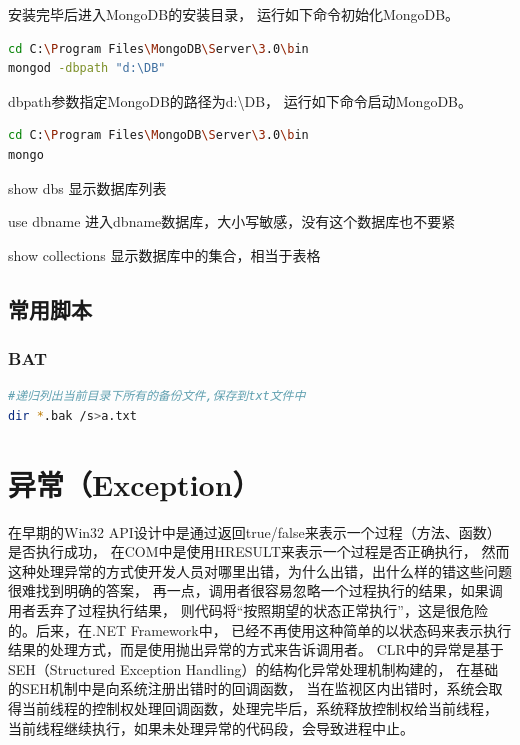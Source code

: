 \documentclass{book}
\begin{document}
安装完毕后进入MongoDB的安装目录，
运行如下命令初始化MongoDB。

\begin{lstlisting}[language=Bash]
cd C:\Program Files\MongoDB\Server\3.0\bin
mongod -dbpath "d:\DB"
\end{lstlisting}

dbpath参数指定MongoDB的路径为d:\textbackslash DB，
运行如下命令启动MongoDB。

\begin{lstlisting}[language=Bash]
cd C:\Program Files\MongoDB\Server\3.0\bin
mongo
\end{lstlisting}


show dbs    显示数据库列表

use dbname    进入dbname数据库，大小写敏感，没有这个数据库也不要紧

show collections    显示数据库中的集合，相当于表格


\section{常用脚本}

\subsection{BAT}

\begin{lstlisting}[language=Bash]
#递归列出当前目录下所有的备份文件,保存到txt文件中
dir *.bak /s>a.txt
\end{lstlisting}

\chapter{异常（Exception）}

\clearpage
\mbox{}         
\clearpage

在早期的Win32 API设计中是通过返回true/false来表示一个过程（方法、函数）是否执行成功，
在COM中是使用HRESULT来表示一个过程是否正确执行，
然而这种处理异常的方式使开发人员对哪里出错，为什么出错，出什么样的错这些问题很难找到明确的答案，
再一点，调用者很容易忽略一个过程执行的结果，如果调用者丢弃了过程执行结果，
则代码将“按照期望的状态正常执行”，这是很危险的。后来，在.NET Framework中，
已经不再使用这种简单的以状态码来表示执行结果的处理方式，而是使用抛出异常的方式来告诉调用者。
CLR中的异常是基于SEH（Structured Exception Handling）的结构化异常处理机制构建的，
在基础的SEH机制中是向系统注册出错时的回调函数，
当在监视区内出错时，系统会取得当前线程的控制权处理回调函数，处理完毕后，系统释放控制权给当前线程，
当前线程继续执行，如果未处理异常的代码段，会导致进程中止。
\end{document}
